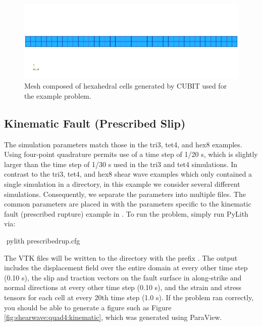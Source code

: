 \begin{figure}
  \includegraphics[scale=0.5]{examples/figs/shearwave_quad4mesh}
  \caption{Mesh composed of hexahedral cells generated by CUBIT used for the
    example problem.}
  \label{fig:shearwave:quad4:mesh}
\end{figure}


\subsection{Kinematic Fault (Prescribed Slip)}

The simulation parameters match those in the tri3, tet4, and hex8
examples. Using four-point quadrature permits use of a time step of
1/20 s, which is slightly larger than the time step of 1/30 s used in
the tri3 and tet4 simulations. In contrast to the tri3, tet4, and hex8
shear wave examples which only contained a single simulation in a
directory, in this example we consider several different simulations.
Consequently, we separate the parameters into multiple 
files. The common parameters are placed in 
with the parameters specific to the kinematic fault (prescribed
rupture) example in . To run the problem,
simply run PyLith via:
\begin{shell}
$$ pylith prescribedrup.cfg
\end{shell}
The VTK files will be written to the  directory with
the prefix . The output includes the
displacement field over the entire domain at every other time step
(0.10 s), the slip and traction vectors on the fault surface in
along-strike and normal directions at every other time step (0.10 s),
and the strain and stress tensors for each cell at every 20th time
step (1.0 s).  If the problem ran correctly, you should be able to
generate a figure such as Figure \vref{fig:shearwave:quad4:kinematic},
which was generated using ParaView.

